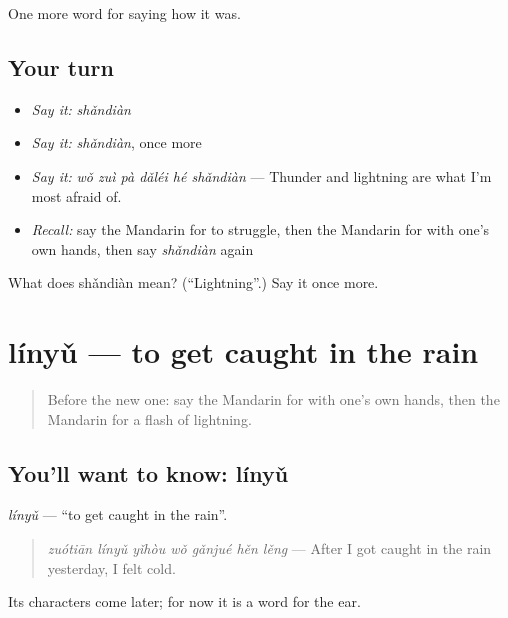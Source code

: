 \begin{grammarlens}[title={What you've built}]
One more word for saying how it was.
\end{grammarlens}

\subsection*{Your turn}
\begin{itemize}
\raggedright
  \item \emph{Say it:} \emph{shǎndiàn}
  \item \emph{Say it:} \emph{shǎndiàn}, once more
  \item \emph{Say it:} \emph{wǒ zuì pà dǎléi hé shǎndiàn} — Thunder and lightning are what I'm most afraid of.
  \item \emph{Recall:} say the Mandarin for to struggle, then the Mandarin for with one's own hands, then say \emph{shǎndiàn} again
\end{itemize}

\begin{tcolorbox}[breakable,colback=teal!4,colframe=teal!35!black,title={Before you move on}]
What does shǎndiàn mean? (\textquotedblleft{}Lightning\textquotedblright{}.) Say it once more.
\end{tcolorbox}
\section[línyǔ]{línyǔ — to get caught in the rain}

\label{lesson:ZH-C514-linyu}



\begin{quote}
Before the new one: say the Mandarin for with one's own hands, then the Mandarin for a flash of lightning.
\end{quote}

\subsection*{You'll want to know: línyǔ}
\emph{línyǔ} — \textquotedblleft{}to get caught in the rain\textquotedblright{}.

\begin{quote}
\emph{zuótiān línyǔ yǐhòu wǒ gǎnjué hěn lěng} — After I got caught in the rain yesterday, I felt cold.
\end{quote}

Its characters come later; for now it is a word for the ear.

